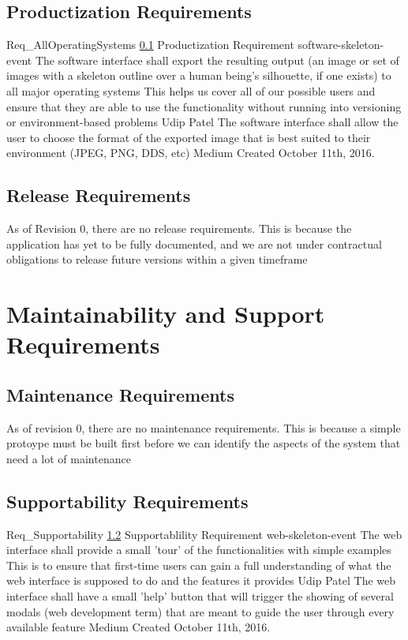 \documentclass{scrreprt}
\begin{document}
\subsection{Productization Requirements}
\label{req-product}

\requirement
{Req_AllOperatingSystems}
{\ref{req-product} Productization Requirement}
{software-skeleton-event}
{The software interface shall export the resulting output (an image or set of images with a skeleton outline over a human being's silhouette, if one exists) to all major operating systems }
{This helps us cover all of our possible users and ensure that they are able to use the functionality without running into versioning or environment-based problems}
{Udip Patel}
{The software interface shall allow the user to choose the format of the exported image that is best suited to their environment (JPEG, PNG, DDS, etc) }
{Medium}
{Created October 11th, 2016.}




\subsection{Release Requirements}
\label{req-release}
As of Revision 0, there are no release requirements. This is because the application has yet to be fully documented, and we are not under contractual obligations to release future versions within a given timeframe


\section{Maintainability and Support Requirements}

\subsection{Maintenance Requirements}
\label{req-maintenance}

As of revision 0, there are no maintenance requirements. This is because a simple protoype must be built first before we can identify the aspects of the system that need a lot of maintenance

\subsection{Supportability Requirements}
\label{req-supportability}

\requirement
{Req_Supportability}
{\ref{req-supportability} Supportablility Requirement}
{web-skeleton-event}
{The web interface shall provide a small 'tour' of the functionalities with simple examples}
{This is to ensure that first-time users can gain a full understanding of what the web interface is supposed to do and the features it provides}
{Udip Patel}
{The web interface shall have a small 'help' button that will trigger the showing of several modals (web development term) that are meant to guide the user through every available feature}
{Medium}
{Created October 11th, 2016.}
\end{document}
